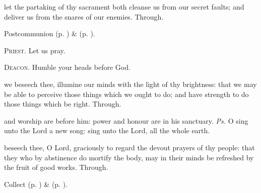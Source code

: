 
\postcommunion
{} let the partaking of thy sacrament both cleanse us from our secret faults; and deliver us from the snares of our enemies. Through.


\begin{rubric}
     Postcommunion  (p. \pageref{AshWednesdayMassPostcommunion}) \&   (p. \pageref{SPLivingDeparted}).
\end{rubric}

\textsc{Priest.} Let us pray.\par
\textsc{Deacon.} Humble your heads before God.\par
{} we beseech thee, illumine our minds with the light of thy brightness: that we may be able to perceive those things which we ought to do; and have strength to do those things which be right. Through.

\vspace{-0.1\baselineskip}

\fancyhead[RE,LO]{}

\introit
{} and worship are before him: power and honour are in his sanctuary. \textit{Ps.} O sing unto the Lord a new song: sing unto the Lord, all the whole earth.

\vspace{-0.3\baselineskip}

\collect

\vspace{-0.1\baselineskip}

 beseech thee, O Lord, graciously to regard the devout prayers of thy people: that they who by abstinence do mortify the body, may in their minds be refreshed by the fruit of good works. Through.
\begin{rubric}
     Collect  (p. \pageref{AshWednesdayMassCollect}) \&   (p. \pageref{SPLivingDeparted}).
\end{rubric}

\vspace{-0.3\baselineskip}

